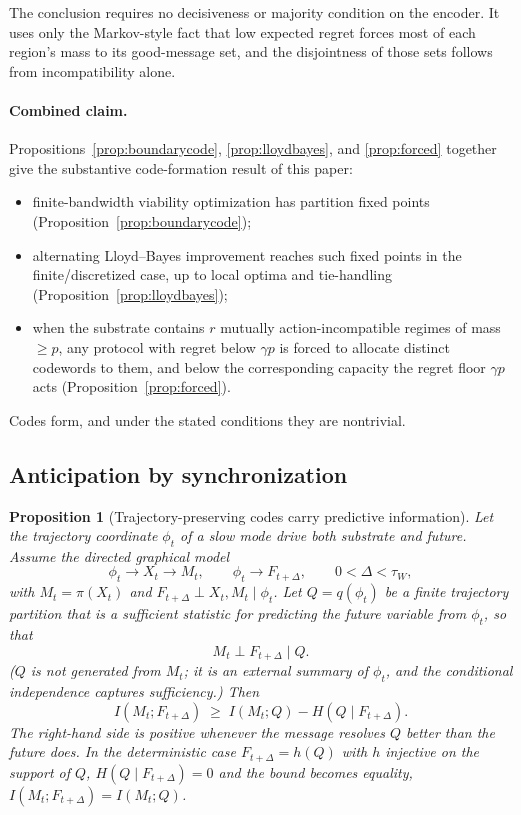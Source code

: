 \documentclass[12pt]{article}
\newtheorem{proposition}{Proposition}
\theoremstyle{definition}
\newcommand{\I}{I}
\begin{document}
The conclusion requires no decisiveness or majority condition on the encoder. It uses only the Markov-style fact that low expected regret forces most of each region's mass to its good-message set, and the disjointness of those sets follows from incompatibility alone.

\paragraph{Combined claim.} Propositions~\ref{prop:boundarycode}, \ref{prop:lloydbayes}, and \ref{prop:forced} together give the substantive code-formation result of this paper:
\begin{itemize}
\setlength\itemsep{0pt}
\item finite-bandwidth viability optimization has partition fixed points (Proposition~\ref{prop:boundarycode});
\item alternating Lloyd--Bayes improvement reaches such fixed points in the finite/discretized case, up to local optima and tie-handling (Proposition~\ref{prop:lloydbayes});
\item when the substrate contains $r$ mutually action-incompatible regimes of mass $\geq p$, any protocol with regret below $\gamma p$ is forced to allocate distinct codewords to them, and below the corresponding capacity the regret floor $\gamma p$ acts (Proposition~\ref{prop:forced}).
\end{itemize}
Codes form, and under the stated conditions they are nontrivial.

\subsection{Anticipation by synchronization}

\begin{proposition}[Trajectory-preserving codes carry predictive information]
\label{prop:anticipation}
Let the trajectory coordinate $\phi_t$ of a slow mode drive both substrate and future. Assume the directed graphical model
\[
\phi_t \to X_t \to M_t,\qquad \phi_t \to F_{t+\Delta},\qquad 0<\Delta<\tau_W,
\]
with $M_t=\pi(X_t)$ and $F_{t+\Delta}\perp X_t,M_t\mid\phi_t$. Let $Q=q(\phi_t)$ be a finite trajectory partition that is a sufficient statistic for predicting the future variable from $\phi_t$, so that
\[
M_t \perp F_{t+\Delta}\mid Q.
\]
($Q$ is not generated from $M_t$; it is an external summary of $\phi_t$, and the conditional independence captures sufficiency.) Then
\[
\I(M_t;F_{t+\Delta}) \;\geq\; \I(M_t;Q) - H(Q\mid F_{t+\Delta}).
\]
The right-hand side is positive whenever the message resolves $Q$ better than the future does. In the deterministic case $F_{t+\Delta}=h(Q)$ with $h$ injective on the support of $Q$, $H(Q\mid F_{t+\Delta})=0$ and the bound becomes equality, $\I(M_t;F_{t+\Delta})=\I(M_t;Q)$.
\end{proposition}
\end{document}
